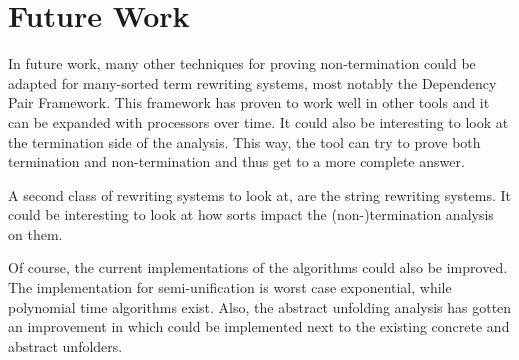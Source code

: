 \chapter{Future Work}\label{futurework}
In future work, many other techniques for proving non-termination could be adapted for many-sorted term rewriting systems, most notably the Dependency Pair Framework. This framework has proven to work well in other tools and it can be expanded with processors over time. It could also be interesting to look at the termination side of the analysis. This way, the tool can try to prove both termination and non-termination and thus get to a more complete answer.

A second class of rewriting systems to look at, are the string rewriting systems. It could be interesting to look at how sorts impact the (non-)termination analysis on them. 

Of course, the current implementations of the algorithms could also be improved. The implementation for semi-unification is worst case exponential, while polynomial time algorithms exist\cite{SemiUnification}\cite{OLIART2004455}. Also, the abstract unfolding analysis has gotten an improvement in \cite{PAYET:NTI} which could be implemented next to the existing concrete and abstract unfolders. 